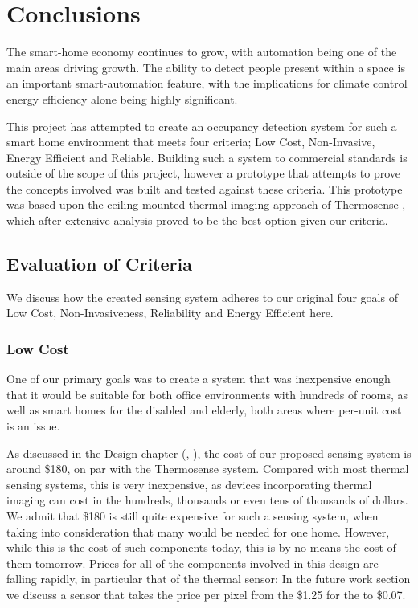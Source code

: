 \documentclass[../thesis/thesis.tex]{subfiles}
\begin{document}
 \chapter{Conclusions}

The smart-home economy continues to grow, with automation being one of the main areas driving growth. The ability to detect people present within a space is an important smart-automation feature, with the implications for climate control energy efficiency alone being highly significant.

This project has attempted to create an occupancy detection system for such a smart home environment that meets four criteria; Low Cost, Non-Invasive, Energy Efficient and Reliable. Building such a system to commercial standards is outside of the scope of this project, however a prototype that attempts to prove the concepts involved was built and tested against these criteria. This prototype was based upon the ceiling-mounted thermal imaging approach of Thermosense \cite{beltran2013thermosense}, which after extensive analysis proved to be the best option given our criteria.

\section{Evaluation of Criteria}
We discuss how the created sensing system adheres to our original four goals of Low Cost, Non-Invasiveness, Reliability and Energy Efficient here.

\subsection{Low Cost}
One of our primary goals was to create a system that was inexpensive enough that it would be suitable for both office environments with hundreds of rooms, as well as smart homes for the disabled and elderly, both areas where per-unit cost is an issue.

As discussed in the Design chapter (, ), the cost of our proposed sensing system is around \$180, on par with the Thermosense system. Compared with most thermal sensing systems, this is very inexpensive, as devices incorporating thermal imaging can cost in the hundreds, thousands or even tens of thousands of dollars. We admit that \$180 is still quite expensive for such a sensing system, when taking into consideration that many would be needed for one home. However, while this is the cost of such components today, this is by no means the cost of them tomorrow. Prices for all of the components involved in this design are falling rapidly, in particular that of the thermal sensor: In the future work section we discuss a sensor that takes the price per pixel from the \$1.25 for the \mlx to \$0.07.
\end{document}
